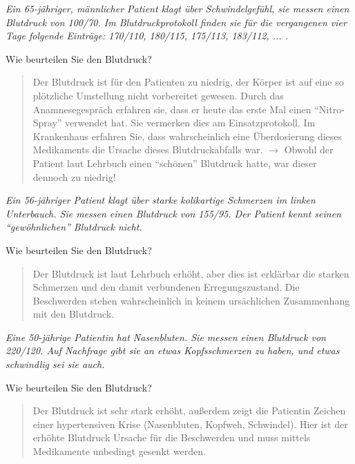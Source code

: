 
\emph{Ein 65-jähriger, männlicher Patient klagt über
Schwindelgefühl, sie messen einen Blutdruck von 100/70. Im Blutdruckprotokoll finden sie
für die vergangenen vier Tage folgende Einträge: 170/110, 180/115,
175/113, 183/112, ... .}


Wie beurteilen Sie den Blutdruck?

\begin{quote}
Der Blutdruck ist für den Patienten zu niedrig, der Körper ist auf
eine so plötzliche Umstellung nicht vorbereitet gewesen. Durch das 
Anamnesegespräch erfahren sie, dass er heute das erste Mal einen
"`Nitro-Spray"' verwendet hat. Sie
vermerken dies am Einsatzprotokoll. Im Krankenhaus erfahren Sie, dass
wahrscheinlich eine Überdosierung dieses Medikaments die Ursache
dieses Blutdruckabfalls war. ${\rightarrow}$ Obwohl der Patient laut
Lehrbuch einen "`schönen"' Blutdruck
hatte, war dieser dennoch zu niedrig!
\end{quote}

\emph{Ein 56-jähriger Patient klagt über starke
kolikartige Schmerzen im linken Unterbauch. Sie messen einen Blutdruck von 155/95. Der Patient
kennt seinen "`gewöhnlichen"' Blutdruck
nicht.}  

Wie beurteilen Sie den Blutdruck? 

\begin{quote}
Der Blutdruck ist laut Lehrbuch erhöht, aber dies ist erklärbar die
starken Schmerzen und den damit verbundenen Erregungszustand. Die
Beschwerden stehen wahrscheinlich in keinem ursächlichen Zusammenhang
mit den Blutdruck. 
\end{quote}

\emph{Eine 50-jährige Patientin hat Nasenbluten. Sie
messen einen Blutdruck von 220/120. Auf Nachfrage gibt sie an etwas Kopfsschmerzen zu haben,
und etwas schwindlig sei sie auch.} 

Wie beurteilen Sie den Blutdruck? 

\begin{quote}
Der Blutdruck ist sehr stark erhöht, außerdem zeigt die
Patientin Zeichen einer hypertensiven Krise (Nasenbluten, Kopfweh, Schwindel).
Hier ist der erhöhte Blutdruck Ursache für die Beschwerden und muss
mittels Medikamente unbedingt gesenkt werden. 
\end{quote}



